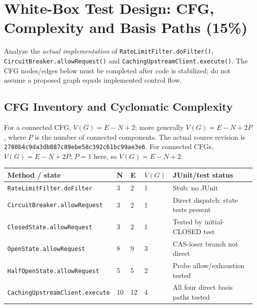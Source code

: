 \documentclass[11pt,a4paper]{article}
\begin{document}
\section{White-Box Test Design: CFG, Complexity and Basis Paths (15\%)}\label{sec:whitebox}
Analyze the \emph{actual implementation} of \texttt{RateLimitFilter.doFilter()}, \texttt{CircuitBreaker.allowRequest()} and \texttt{CachingUpstreamClient.execute()}. The CFG nodes/edges below must be completed after code is stabilized; do not assume a proposed graph equals implemented control flow.
\subsection{CFG Inventory and Cyclomatic Complexity}
For a connected CFG, $V(G) = E-N+2$; more generally $V(G) = E-N+2P$, where $P$ is the number of connected components.
The actual source revision is \texttt{2780b4c9da3db887c89ebe58c392c61bc99ae3e6}. For connected CFGs, $V(G)=E-N+2P$; $P=1$ here, so $V(G)=E-N+2$.\par
\begin{longtable}{L{4.7cm} L{1.2cm} L{1.2cm} L{1.3cm} L{3.6cm}}\toprule
\textbf{Method / state} & \textbf{N} & \textbf{E} & $V(G)$ & \textbf{JUnit/test status}\\\midrule\endhead
\texttt{RateLimitFilter.doFilter} & 3 & 2 & 1 & Stub: no JUnit\\
\texttt{CircuitBreaker.allowRequest} & 3 & 2 & 1 & Direct dispatch: state tests present\\
\texttt{ClosedState.allowRequest} & 3 & 2 & 1 & Tested by initial-CLOSED test\\
\texttt{OpenState.allowRequest} & 8 & 9 & 3 & CAS-loser branch not direct\\
\texttt{HalfOpenState.allowRequest} & 5 & 5 & 2 & Probe allow/exhaustion tested\\
\texttt{CachingUpstreamClient.execute} & 10 & 12 & 4 & All four direct basis paths tested\\\bottomrule\end{longtable}
\end{document}

